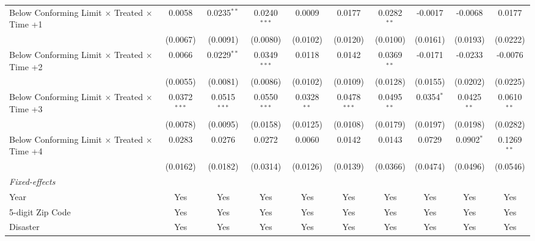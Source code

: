 \begin{tabular}{lccccccccc}
   Below Conforming Limit $\times$ Treated $\times$ Time +1   & 0.0058         & 0.0235$^{**}$  & 0.0240$^{***}$ & 0.0009        & 0.0177         & 0.0282$^{**}$ & -0.0017      & -0.0068       & 0.0177\\   
                                                              & (0.0067)       & (0.0091)       & (0.0080)       & (0.0102)      & (0.0120)       & (0.0100)      & (0.0161)     & (0.0193)      & (0.0222)\\   
   Below Conforming Limit $\times$ Treated $\times$ Time +2   & 0.0066         & 0.0229$^{**}$  & 0.0349$^{***}$ & 0.0118        & 0.0142         & 0.0369$^{**}$ & -0.0171      & -0.0233       & -0.0076\\   
                                                              & (0.0055)       & (0.0081)       & (0.0086)       & (0.0102)      & (0.0109)       & (0.0128)      & (0.0155)     & (0.0202)      & (0.0225)\\   
   Below Conforming Limit $\times$ Treated $\times$ Time +3   & 0.0372$^{***}$ & 0.0515$^{***}$ & 0.0550$^{***}$ & 0.0328$^{**}$ & 0.0478$^{***}$ & 0.0495$^{**}$ & 0.0354$^{*}$ & 0.0425$^{**}$ & 0.0610$^{**}$\\   
                                                              & (0.0078)       & (0.0095)       & (0.0158)       & (0.0125)      & (0.0108)       & (0.0179)      & (0.0197)     & (0.0198)      & (0.0282)\\   
   Below Conforming Limit $\times$ Treated $\times$ Time +4   & 0.0283         & 0.0276         & 0.0272         & 0.0060        & 0.0142         & 0.0143        & 0.0729       & 0.0902$^{*}$  & 0.1269$^{**}$\\   
                                                              & (0.0162)       & (0.0182)       & (0.0314)       & (0.0126)      & (0.0139)       & (0.0366)      & (0.0474)     & (0.0496)      & (0.0546)\\   
   \midrule
   \emph{Fixed-effects}\\
   Year                                                       & Yes            & Yes            & Yes            & Yes           & Yes            & Yes           & Yes          & Yes           & Yes\\  
   5-digit Zip Code                                           & Yes            & Yes            & Yes            & Yes           & Yes            & Yes           & Yes          & Yes           & Yes\\  
   Disaster                                                   & Yes            & Yes            & Yes            & Yes           & Yes            & Yes           & Yes          & Yes           & Yes\\  

\end{tabular}
